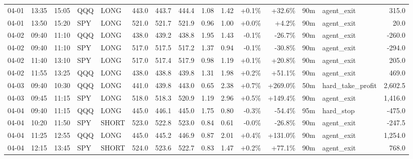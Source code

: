 \documentclass[11pt,a4paper,twoside]{article}
\begin{document}
\begin{landscape}
\begin{center}
\begin{longtable}{>{\color{txtmain}}l l l l l r r r r r r r r >{\color{txtmain}}l r}
04-01 & 13:35 & 15:05 & QQQ & LONG & 443.0 & 443.7 & 444.4 & 1.08 & 1.42 & \textcolor{wingreen}{+0.1\%} & \textcolor{wingreen}{+32.6\%} & 90m & agent\_exit & \textcolor{wingreen}{315.0} \\
04-01 & 13:50 & 15:20 & SPY & LONG & 521.0 & 521.7 & 521.9 & 0.96 & 1.00 & \textcolor{wingreen}{+0.0\%} & \textcolor{wingreen}{+4.2\%} & 90m & agent\_exit & \textcolor{wingreen}{20.0} \\
04-02 & 09:40 & 11:10 & QQQ & LONG & 438.0 & 439.2 & 438.8 & 1.95 & 1.43 & \textcolor{lossred}{-0.1\%} & \textcolor{lossred}{-26.7\%} & 90m & agent\_exit & \textcolor{lossred}{-260.0} \\
04-02 & 09:40 & 11:10 & SPY & LONG & 517.0 & 517.5 & 517.2 & 1.37 & 0.94 & \textcolor{lossred}{-0.1\%} & \textcolor{lossred}{-30.8\%} & 90m & agent\_exit & \textcolor{lossred}{-294.0} \\
04-02 & 11:40 & 13:10 & SPY & LONG & 517.0 & 517.4 & 517.9 & 0.98 & 1.19 & \textcolor{wingreen}{+0.1\%} & \textcolor{wingreen}{+20.8\%} & 90m & agent\_exit & \textcolor{wingreen}{205.0} \\
04-02 & 11:55 & 13:25 & QQQ & LONG & 438.0 & 438.8 & 439.8 & 1.31 & 1.98 & \textcolor{wingreen}{+0.2\%} & \textcolor{wingreen}{+51.1\%} & 90m & agent\_exit & \textcolor{wingreen}{469.0} \\
04-03 & 09:40 & 10:30 & QQQ & LONG & 441.0 & 439.8 & 443.0 & 0.65 & 2.38 & \textcolor{wingreen}{+0.7\%} & \textcolor{wingreen}{+269.0\%} & 50m & hard\_take\_profit & \textcolor{wingreen}{2,602.5} \\
04-03 & 09:45 & 11:15 & SPY & LONG & 518.0 & 518.3 & 520.9 & 1.19 & 2.96 & \textcolor{wingreen}{+0.5\%} & \textcolor{wingreen}{+149.4\%} & 90m & agent\_exit & \textcolor{wingreen}{1,416.0} \\
04-04 & 09:40 & 11:15 & QQQ & LONG & 445.0 & 446.1 & 445.0 & 1.75 & 0.80 & \textcolor{lossred}{-0.3\%} & \textcolor{lossred}{-54.4\%} & 95m & hard\_stop & \textcolor{lossred}{-475.0} \\
04-04 & 10:20 & 11:50 & SPY & SHORT & 523.0 & 522.8 & 523.0 & 0.84 & 0.61 & \textcolor{lossred}{-0.0\%} & \textcolor{lossred}{-26.8\%} & 90m & agent\_exit & \textcolor{lossred}{-247.5} \\
04-04 & 11:25 & 12:55 & QQQ & LONG & 445.0 & 445.2 & 446.9 & 0.87 & 2.01 & \textcolor{wingreen}{+0.4\%} & \textcolor{wingreen}{+131.0\%} & 90m & agent\_exit & \textcolor{wingreen}{1,254.0} \\
04-04 & 12:15 & 13:45 & SPY & SHORT & 524.0 & 523.6 & 522.7 & 0.83 & 1.47 & \textcolor{wingreen}{+0.2\%} & \textcolor{wingreen}{+77.1\%} & 90m & agent\_exit & \textcolor{wingreen}{768.0} \\

\end{longtable}
\end{center}
\end{landscape}
\end{document}
